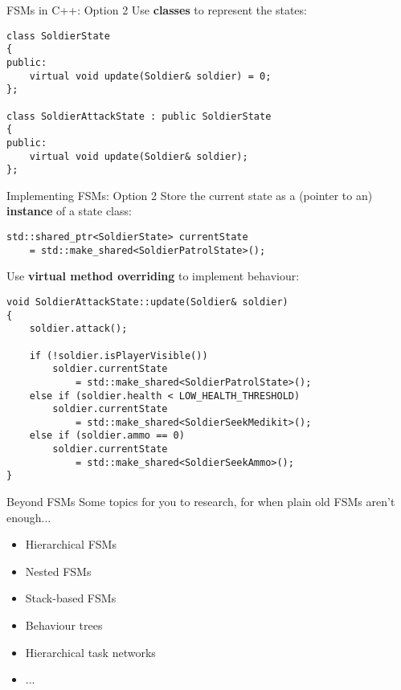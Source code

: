 \begin{frame}[fragile]{FSMs in C++: Option 2}
    Use \textbf{classes} to represent the states:
    \begin{lstlisting}
class SoldierState
{
public:
    virtual void update(Soldier& soldier) = 0;
};

class SoldierAttackState : public SoldierState
{
public:
    virtual void update(Soldier& soldier);
};
    \end{lstlisting}
\end{frame}

\begin{frame}[fragile]{Implementing FSMs: Option 2}
    Store the current state as a (pointer to an) \textbf{instance} of a state class:
    \begin{lstlisting}
std::shared_ptr<SoldierState> currentState
    = std::make_shared<SoldierPatrolState>();
    \end{lstlisting}
\end{frame}

\begin{frame}[fragile]
    Use \textbf{virtual method overriding} to implement behaviour:
    \begin{lstlisting}
void SoldierAttackState::update(Soldier& soldier)
{
    soldier.attack();
    
    if (!soldier.isPlayerVisible())
        soldier.currentState
            = std::make_shared<SoldierPatrolState>();
    else if (soldier.health < LOW_HEALTH_THRESHOLD)
        soldier.currentState
            = std::make_shared<SoldierSeekMedikit>();
    else if (soldier.ammo == 0)
        soldier.currentState
            = std::make_shared<SoldierSeekAmmo>();
}
    \end{lstlisting}
\end{frame}

\begin{frame}{Beyond FSMs}
    Some topics for you to research, for when plain old FSMs aren't enough... \pause
    \begin{itemize}
        \item Hierarchical FSMs
        \item Nested FSMs
        \item Stack-based FSMs
        \item Behaviour trees
        \item Hierarchical task networks
        \item ...
    \end{itemize}
\end{frame}

